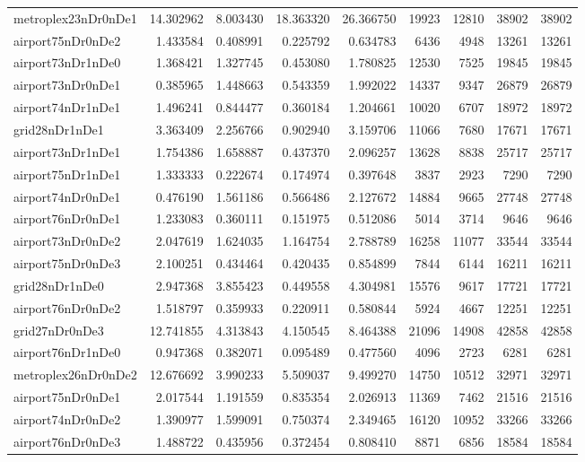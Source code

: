 \begin{longtable}{|l|r|r|r|r|r|r|r|r|}
metroplex23nDr0nDe1 & 14.302962 & 8.003430 & 18.363320 & 26.366750 & 19923 & 12810 & 38902 & 38902 \\
airport75nDr0nDe2 & 1.433584 & 0.408991 & 0.225792 & 0.634783 & 6436 & 4948 & 13261 & 13261 \\
airport73nDr1nDe0 & 1.368421 & 1.327745 & 0.453080 & 1.780825 & 12530 & 7525 & 19845 & 19845 \\
airport73nDr0nDe1 & 0.385965 & 1.448663 & 0.543359 & 1.992022 & 14337 & 9347 & 26879 & 26879 \\
airport74nDr1nDe1 & 1.496241 & 0.844477 & 0.360184 & 1.204661 & 10020 & 6707 & 18972 & 18972 \\
grid28nDr1nDe1 & 3.363409 & 2.256766 & 0.902940 & 3.159706 & 11066 & 7680 & 17671 & 17671 \\
airport73nDr1nDe1 & 1.754386 & 1.658887 & 0.437370 & 2.096257 & 13628 & 8838 & 25717 & 25717 \\
airport75nDr1nDe1 & 1.333333 & 0.222674 & 0.174974 & 0.397648 & 3837 & 2923 & 7290 & 7290 \\
airport74nDr0nDe1 & 0.476190 & 1.561186 & 0.566486 & 2.127672 & 14884 & 9665 & 27748 & 27748 \\
airport76nDr0nDe1 & 1.233083 & 0.360111 & 0.151975 & 0.512086 & 5014 & 3714 & 9646 & 9646 \\
airport73nDr0nDe2 & 2.047619 & 1.624035 & 1.164754 & 2.788789 & 16258 & 11077 & 33544 & 33544 \\
airport75nDr0nDe3 & 2.100251 & 0.434464 & 0.420435 & 0.854899 & 7844 & 6144 & 16211 & 16211 \\
grid28nDr1nDe0 & 2.947368 & 3.855423 & 0.449558 & 4.304981 & 15576 & 9617 & 17721 & 17721 \\
airport76nDr0nDe2 & 1.518797 & 0.359933 & 0.220911 & 0.580844 & 5924 & 4667 & 12251 & 12251 \\
grid27nDr0nDe3 & 12.741855 & 4.313843 & 4.150545 & 8.464388 & 21096 & 14908 & 42858 & 42858 \\
airport76nDr1nDe0 & 0.947368 & 0.382071 & 0.095489 & 0.477560 & 4096 & 2723 & 6281 & 6281 \\
metroplex26nDr0nDe2 & 12.676692 & 3.990233 & 5.509037 & 9.499270 & 14750 & 10512 & 32971 & 32971 \\
airport75nDr0nDe1 & 2.017544 & 1.191559 & 0.835354 & 2.026913 & 11369 & 7462 & 21516 & 21516 \\
airport74nDr0nDe2 & 1.390977 & 1.599091 & 0.750374 & 2.349465 & 16120 & 10952 & 33266 & 33266 \\
airport76nDr0nDe3 & 1.488722 & 0.435956 & 0.372454 & 0.808410 & 8871 & 6856 & 18584 & 18584 \\

\end{longtable}
